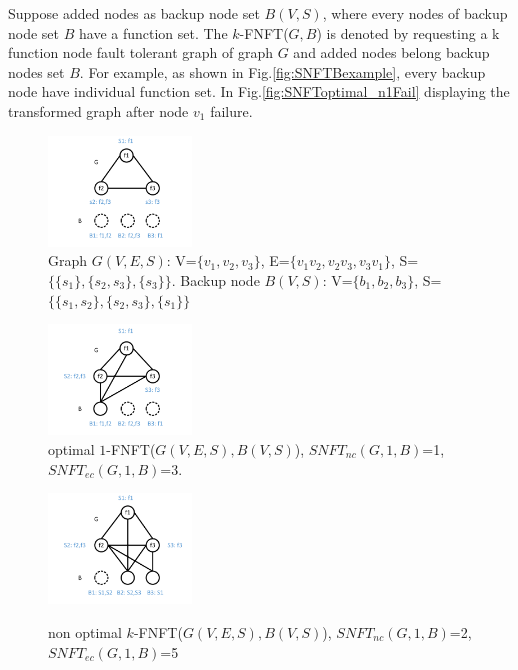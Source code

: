 Suppose added nodes as backup node set $B(V,S)$, where every nodes of backup node set $B$ have a function set. The $k$-FNFT($G,B$) is denoted by requesting a k function node fault tolerant graph of graph $G$ and added nodes belong backup nodes set $B$. For example, as shown in Fig.\ref{fig:SNFTBexample}, every backup node have individual function set. In Fig.\ref{fig:SNFToptimal_n1Fail} displaying the transformed graph after node $v_1$ failure.



\begin{figure}[tp]
\centering
\begin{minipage}[t]{0.3\linewidth}
\centering
\includegraphics[width=1.5in]{Fig/SNFTBexample}\\
\caption{Graph $G(V,E,S)$: V=$\{v_1,v_2,v_3\}$, E=$\{v_1v_2,v_2v_3,v_3v_1\}$, S=$\{\{s_1\},\{s_2,s_3\},\{s_3\}\}$. Backup node $B(V,S)$: V=$\{b_1,b_2,b_3\}$, S=$\{\{s_1,s_2\},\{s_2,s_3\},\{s_1\}\}$ }\label{fig:SNFTBexample}
\end{minipage}
\hfill
\begin{minipage}[t]{0.3\linewidth}
\centering
\includegraphics[width=1.5in]{Fig/SNFToptimal}\\
\caption{optimal $1$-FNFT($G(V,E,S),B(V,S)$), $SNFT_{nc}$$(G,1,B)$=1, $SNFT_{ec}$$(G,1,B)$=3.}\label{fig:SNFToptimal}
\end{minipage}
\hfill
\begin{minipage}[t]{0.3\linewidth}
\centering
\includegraphics[width=1.5in]{Fig/SNFTnonoptimal}\\
\caption{non optimal $k$-FNFT($G(V,E,S),B(V,S)$), $SNFT_{nc}$$(G,1,B)$=2, $SNFT_{ec}$$(G,1,B)$=5}\label{fig:SNFTnonoptimal}
\end{minipage}
\end{figure}


